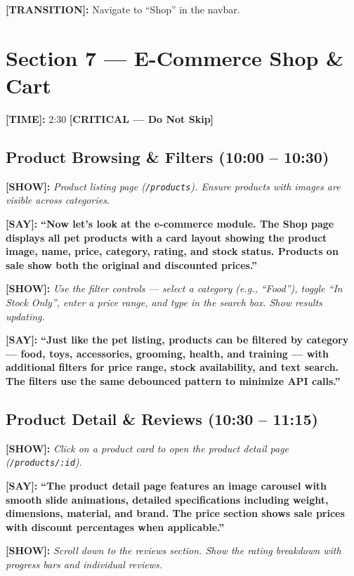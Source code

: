\documentclass[12pt,a4paper]{article}
\newcommand{\say}[1]{\textbf{\textcolor{narration}{[SAY]:}} \textbf{``#1''}}
\newcommand{\show}[1]{\textbf{\textcolor{screen}{[SHOW]:}} \textit{#1}}
\newcommand{\timing}[1]{\textbf{\textcolor{timing}{[TIME]:}} #1}
\newcommand{\trans}[1]{\textbf{\textcolor{transition}{[TRANSITION]:}} #1}
\newcommand{\critical}{\textcolor{critical}{\textbf{[CRITICAL --- Do Not Skip]}}}
\begin{document}
\trans{Navigate to ``Shop'' in the navbar.}

\newpage

\section{Section 7 --- E-Commerce Shop \& Cart}
\label{sec:ecommerce}

\timing{2:30} \hfill \critical

\subsection{Product Browsing \& Filters (10:00 -- 10:30)}

\show{Product listing page (\texttt{/products}). Ensure products with images are visible across categories.}

\say{Now let's look at the e-commerce module. The Shop page displays all pet products with a card layout showing the product image, name, price, category, rating, and stock status. Products on sale show both the original and discounted prices.}

\show{Use the filter controls --- select a category (e.g., ``Food''), toggle ``In Stock Only'', enter a price range, and type in the search box. Show results updating.}

\say{Just like the pet listing, products can be filtered by category --- food, toys, accessories, grooming, health, and training --- with additional filters for price range, stock availability, and text search. The filters use the same debounced pattern to minimize API calls.}

\subsection{Product Detail \& Reviews (10:30 -- 11:15)}

\show{Click on a product card to open the product detail page (\texttt{/products/:id}).}

\say{The product detail page features an image carousel with smooth slide animations, detailed specifications including weight, dimensions, material, and brand. The price section shows sale prices with discount percentages when applicable.}

\show{Scroll down to the reviews section. Show the rating breakdown with progress bars and individual reviews.}
\end{document}
